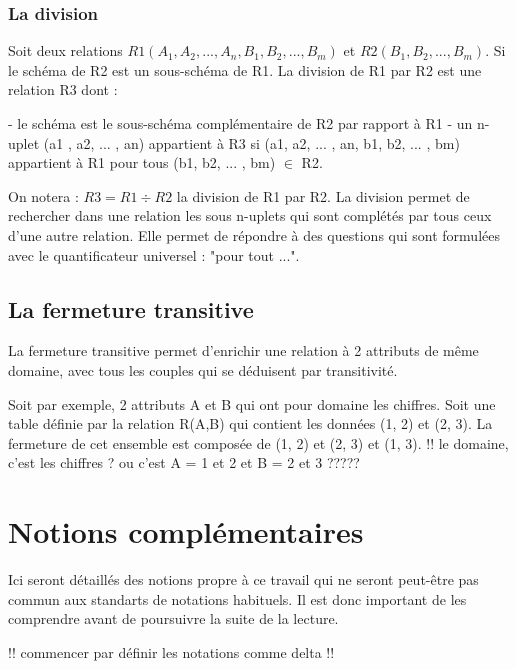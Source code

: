 \documentclass[12pt, a4paper, oneside, titlepage]{book}%
\begin{document}
\subsubsection{La division}
Soit deux relations $R1 (A_1, A_2, ... , A_n, B_1, B_2, ... , B_m)$ et $R2 (B_1, B_2, ... , B_m)$.
Si le schéma de R2 est un sous-schéma de R1. La division de R1 par R2 est une relation R3 dont :
\begin{enumarate}
-  le schéma est le sous-schéma complémentaire de R2 par rapport à R1
-  un n-uplet (a1 , a2, ... , an) appartient à R3 si (a1, a2, ... , an, b1, b2, ... , bm) appartient à R1 pour tous (b1, b2, ... , bm) $\in$ R2.
\end{enumarate}
On notera : $R3 = R1 \div  R2$ la division de R1 par R2. La division permet de rechercher dans une relation les sous n-uplets qui sont complétés par tous ceux d'une autre relation. Elle permet de répondre à des questions qui sont formulées avec le quantificateur universel : "pour tout ...".

\subsection{La fermeture transitive}
La fermeture transitive permet d'enrichir une relation à 2 attributs de même domaine, avec tous les couples qui se déduisent par transitivité.

Soit par exemple, 2 attributs A et B qui ont pour domaine les chiffres.
Soit une table définie par la relation R(A,B) qui contient les données (1, 2) et (2, 3). La fermeture de cet ensemble est composée de (1, 2) et (2, 3) et (1, 3).
!! le domaine, c'est les chiffres ? ou c'est A = 1 et 2 et B = 2 et 3 ?????

\clearpage

\section{Notions complémentaires}\label{SECcomplement}
Ici seront détaillés des notions propre à ce travail qui ne seront peut-être pas commun aux standarts de notations habituels. Il est donc important de les comprendre avant de poursuivre la suite de la lecture.

!! commencer par définir les notations comme delta !!
\end{document}
